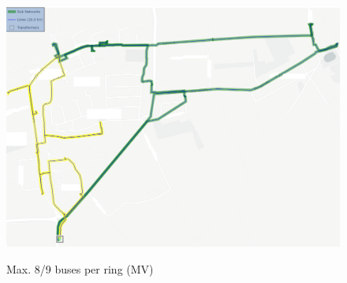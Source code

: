 \begin{figure}[h]
	\begin{centering}
		{\includegraphics[scale=0.4]{figures/experiments/ringsize/ringsize89_2.png}}
		\caption{Max. 8/9 buses per ring (MV)}
		\label{fig:ringsize89_2}
	\end{centering}
\end{figure}
